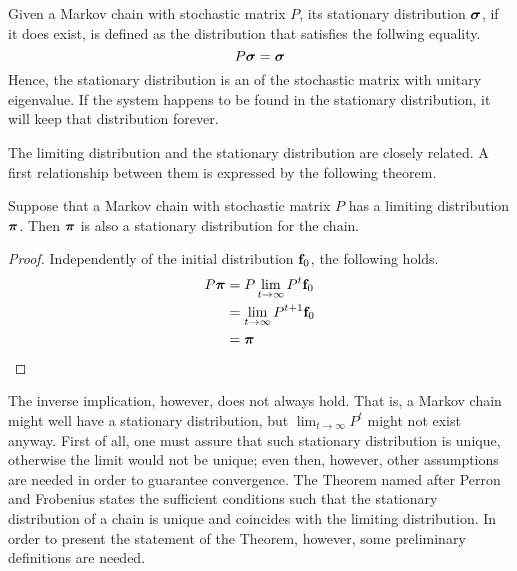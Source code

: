 \begin{ndef} 
    Given a Markov chain with stochastic matrix $P$, its stationary distribution $\boldsymbol{\sigma}$, if it does exist, is defined as the distribution that satisfies the follwing equality.
    \begin{equation}
        P \boldsymbol{\sigma} = \boldsymbol{\sigma}
    \end{equation}
    Hence, the stationary distribution is an  of the stochastic matrix with unitary eigenvalue. If the system happens to be found in the stationary distribution, it will keep that distribution forever.
\end{ndef}
The limiting distribution and the stationary distribution are closely related. A first relationship between them is expressed by the following theorem.

\begin{theorem} \label{th:limit-stat}
    Suppose that a Markov chain with stochastic matrix $P$ has a limiting distribution $\boldsymbol{\pi}$. Then $\boldsymbol{\pi}$ is also a stationary distribution for the chain.
\end{theorem}
\begin{proof}
    Independently of the initial distribution $\mathbf{f}_0$, the following holds.
    \begin{align}
        P \boldsymbol{\pi}
         & = P \lim_{t \rightarrow \infty} P^t \mathbf{f}_0  \\
         & = \lim_{t \rightarrow \infty} P^{t+1} \mathbf{f}_0 \\
         & = \boldsymbol{\pi}
    \end{align}
\end{proof}
The inverse implication, however, does not always hold. That is, a Markov chain might well have a stationary distribution, but $\lim_{t \rightarrow \infty} P^t$ might not exist anyway. First of all, one must assure that such stationary distribution is unique, otherwise the limit would not be unique; even then, however, other assumptions are needed in order to guarantee convergence. The Theorem named after Perron and Frobenius states the sufficient conditions such that the stationary distribution of a chain is unique and coincides with the limiting distribution. In order to present the statement of the Theorem, however, some preliminary definitions are needed. 

